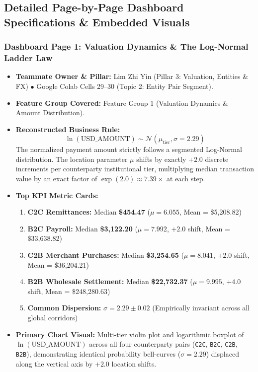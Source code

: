 \documentclass[11pt,a4paper]{article}
\begin{document}
\subsection{Detailed Page-by-Page Dashboard Specifications \& Embedded Visuals}

\subsubsection{Dashboard Page 1: Valuation Dynamics \& The Log-Normal Ladder Law}
\begin{itemize}
    \item \textbf{Teammate Owner \& Pillar:} Lim Zhi Yin (Pillar 3: Valuation, Entities \& FX) $\bullet$ Google Colab Cells 29--30 (Topic 2: Entity Pair Segment).
    \item \textbf{Feature Group Covered:} Feature Group 1 (Valuation Dynamics \& Amount Distribution).
    \item \textbf{Reconstructed Business Rule:}
    \begin{equation}
    \ln(\text{USD\_AMOUNT}) \sim \mathcal{N}(\mu_{\text{tier}}, \sigma = 2.29)
    \end{equation}
    The normalized payment amount strictly follows a segmented Log-Normal distribution. The location parameter $\mu$ shifts by exactly $+2.0$ discrete increments per counterparty institutional tier, multiplying median transaction value by an exact factor of $\exp(2.0) \approx 7.39\times$ at each step.
    \item \textbf{Top KPI Metric Cards:}
    \begin{enumerate}
        \item \textbf{C2C Remittances:} Median \textbf{\$454.47} ($\mu = 6.055$, Mean = \$5,208.82)
        \item \textbf{B2C Payroll:} Median \textbf{\$3,122.20} ($\mu = 7.992$, $+2.0$ shift, Mean = \$33,638.82)
        \item \textbf{C2B Merchant Purchases:} Median \textbf{\$3,254.65} ($\mu = 8.041$, $+2.0$ shift, Mean = \$36,204.21)
        \item \textbf{B2B Wholesale Settlement:} Median \textbf{\$22,732.37} ($\mu = 9.995$, $+4.0$ shift, Mean = \$248,280.63)
        \item \textbf{Common Dispersion:} $\sigma = 2.29 \pm 0.02$ (Empirically invariant across all global corridors)
    \end{enumerate}
    \item \textbf{Primary Chart Visual:} Multi-tier violin plot and logarithmic boxplot of $\ln(\text{USD\_AMOUNT})$ across all four counterparty pairs (\texttt{C2C}, \texttt{B2C}, \texttt{C2B}, \texttt{B2B}), demonstrating identical probability bell-curves ($\sigma=2.29$) displaced along the vertical axis by $+2.0$ location shifts.

\end{itemize}
\end{document}
